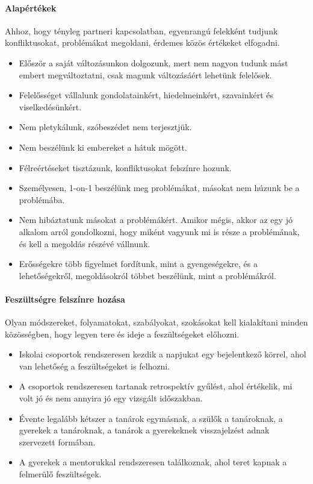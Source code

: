 \paragraph{Alapértékek}
Ahhoz, hogy tényleg partneri kapcsolatban, egyenrangú felekként tudjunk
konfliktusokat, problémákat megoldani, érdemes közös értékeket elfogadni.
\begin{itemize}
      \item Először a saját változásunkon dolgozunk, mert nem nagyon tudunk
            mást
            embert megváltoztatni, csak magunk változásáért
            lehetünk
            felelősek.
      \item Felelősséget vállalunk gondolatainkért, hiedelmeinkért, szavainkért
            és
            viselkedésünkért.
      \item Nem pletykálunk, szóbeszédet nem terjesztjük.
      \item Nem beszélünk ki embereket a hátuk mögött.
      \item Félreértéseket tisztázunk, konfliktusokat felszínre hozunk.
      \item Személyesen, 1-on-1 beszélünk meg problémákat, másokat nem húzunk
            be
            a
            problémába.
      \item Nem hibáztatunk másokat a problémákért. Amikor mégis, akkor az egy
            jó
            alkalom arról gondolkozni, hogy
            miként vagyunk mi is része a problémának, és kell a megoldás
            részévé
            vállnunk.
      \item Erősségekre több figyelmet fordítunk, mint a gyengeségekre, és a
            lehetőségekről, megoldásokról többet beszélünk, mint a
            problémákról.
\end{itemize}

\paragraph{Feszültségre felszínre hozása}
Olyan módszereket, folyamatokat, szabályokat, szokásokat kell kialakítani
minden közösségben, hogy legyen tere és ideje a feszültségeket előhozni.
\begin{itemize}
      \item Iskolai csoportok rendszeresen kezdik a napjukat egy bejelentkező
            körrel, ahol van lehetőség a feszültségeket is felhozni.
      \item A csoportok rendszeresen tartanak retrospektív gyűlést, ahol
            értékelik, mi volt jó és nem annyira jó egy vizsgált időszakban.
      \item Évente legalább kétszer a tanárok egymásnak, a szülők a tanároknak,
            a
            gyerekek a tanároknak, a tanárok a gyerekeknek visszajelzést adnak
            szervezett
            formában.
      \item A gyerekek a mentorukkal rendszeresen találkoznak, ahol teret
            kapnak
            a felmerülő feszültségek.
\end{itemize}

